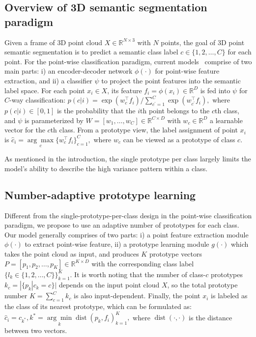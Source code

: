 \documentclass[runningheads]{llncs}
\begin{document}
\subsection{Overview of 3D semantic segmentation paradigm}
Given a frame of 3D point cloud $X \in \mathbb{R}^{N\times3}$ with $N$ points, the goal of 3D point semantic segmentation is to predict a semantic class label $c \in \{1, 2, \dots, C \}$ for each point.  For the point-wise classification paradigm, current models~\cite{hu2020randla,milioto2019rangenet++} comprise of two main parts: i) an encoder-decoder network $\phi(\cdot)$ for point-wise feature extraction, and ii) a classifier $\psi$ to project the point features into the semantic label space. For each point $x_i \in X $, 
its feature $f_{i} = \phi(x_i) \in \mathbb{R}^D$ is fed into $\psi$ for $C$-way classification:
$
    p(c|{i})={\exp \left(w_{c}^{\top} f_{i}\right)} / {\sum_{c^{\prime}=1}^{C} \exp \left(w_{c^{\prime}}^{\top} f_{i}\right)}, 
$
where $p(c|{i}) \in \left[0,1 \right]$ is the probability that the $i$th point belongs to the $c$th class, and $\psi$ is parameterized by ${W} = \left[{w}_1,\dots,{w}_C \right] \in \mathbb{R}^{C\times D}$ with ${w}_c \in \mathbb{R}^D$ a learnable vector for the $c$th class. From a prototype view, the label assignment of point $x_i$ is 
$
    \widehat{c}_i = \underset{c}{\arg \max}\{{w}_{c}^{\top} f_{i}\} _{c=1}^{C},
$
where $w_c$ can be viewed as a prototype of class $c$. 

As mentioned in the introduction, the single prototype per class largely limits the model's ability to describe the high variance pattern within a class.

\subsection{Number-adaptive prototype learning} \label{sec:napl}

Different from the single-prototype-per-class design in the point-wise classification paradigm, we propose to use an adaptive number of prototypes for each class. Our model generally comprises of two parts: i) a point feature extraction module $\phi(\cdot)$ to extract point-wise feature, ii) a prototype learning module $ g(\cdot) $ which takes the point cloud as input, and produces $K$ prototype vectors $P = \left[ p_1, p_2, \dots, p_K \right] \in \mathbb{R}^{K\times D}$ with the corresponding class label $\{l_k \in \{1, 2, \dots, C \}\}_{k=1}^{K}$. It is worth noting that the number of class-$c$ prototypes  $k_c = |\{p_k | c_k = c \}|$ depends on the input point cloud $X$, so the total prototype number $K=\sum_{c=1}^C k_c$ is also input-dependent. Finally, the point $x_i$ is labeled as the class of its nearest prototype, which can be formulated as: 
$
    \widehat{c}_i = c_{k^*}, k^* = \underset{k}{\arg \min } \operatorname{dist}(p_k, f_{i})_{k=1}^{K},
$
where $\operatorname{dist}(\cdot, \cdot)$ is the distance between two vectors. 
\end{document}
